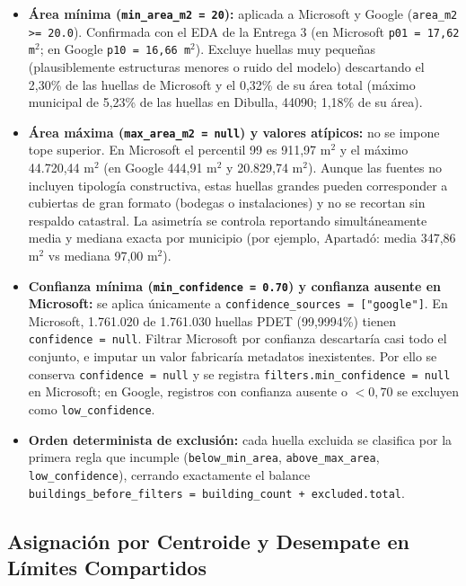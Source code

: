\documentclass[11pt, a4paper]{article}
\begin{document}
\begin{itemize}
    \item \textbf{Área mínima (\texttt{min\_area\_m2 = 20}):} aplicada a Microsoft y Google (\texttt{area\_m2 >= 20.0}). Confirmada con el EDA de la Entrega 3 (en Microsoft \texttt{p01 = 17,62 m$^2$}; en Google \texttt{p10 = 16,66 m$^2$}). Excluye huellas muy pequeñas (plausiblemente estructuras menores o ruido del modelo) descartando el 2,30\% de las huellas de Microsoft y el 0,32\% de su área total (máximo municipal de 5,23\% de las huellas en Dibulla, 44090; 1,18\% de su área).
    \item \textbf{Área máxima (\texttt{max\_area\_m2 = null}) y valores atípicos:} no se impone tope superior. En Microsoft el percentil 99 es 911,97 m$^2$ y el máximo 44.720,44 m$^2$ (en Google 444,91 m$^2$ y 20.829,74 m$^2$). Aunque las fuentes no incluyen tipología constructiva, estas huellas grandes pueden corresponder a cubiertas de gran formato (bodegas o instalaciones) y no se recortan sin respaldo catastral. La asimetría se controla reportando simultáneamente media y mediana exacta por municipio (por ejemplo, Apartadó: media 347,86 m$^2$ vs mediana 97,00 m$^2$).
    \item \textbf{Confianza mínima (\texttt{min\_confidence = 0.70}) y confianza ausente en Microsoft:} se aplica únicamente a \texttt{confidence\_sources = ["google"]}. En Microsoft, 1.761.020 de 1.761.030 huellas PDET (99,9994\%) tienen \texttt{confidence = null}. Filtrar Microsoft por confianza descartaría casi todo el conjunto, e imputar un valor fabricaría metadatos inexistentes. Por ello se conserva \texttt{confidence = null} y se registra \texttt{filters.min\_confidence = null} en Microsoft; en Google, registros con confianza ausente o $< 0{,}70$ se excluyen como \texttt{low\_confidence}.
    \item \textbf{Orden determinista de exclusión:} cada huella excluida se clasifica por la primera regla que incumple (\texttt{below\_min\_area}, \texttt{above\_max\_area}, \texttt{low\_confidence}), cerrando exactamente el balance \texttt{buildings\_before\_filters = building\_count + excluded.total}.
\end{itemize}

\subsection{Asignación por Centroide y Desempate en Límites Compartidos}
\end{document}
